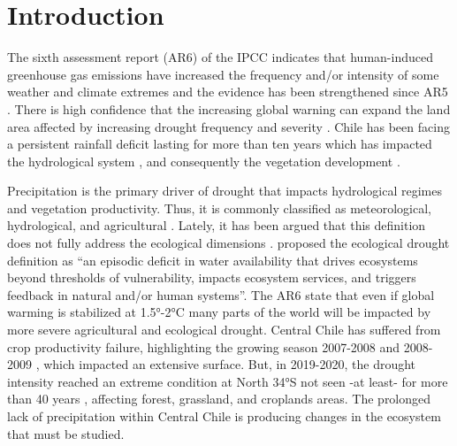 \documentclass[preprint,
3p]{elsarticle} %
\begin{document}
\hypertarget{introduction}{%
\section{Introduction}\label{introduction}}

The sixth assessment report (AR6) of the IPCC \citep{IPCC2021} indicates
that human-induced greenhouse gas emissions have increased the frequency
and/or intensity of some weather and climate extremes and the evidence
has been strengthened since AR5 \citep{IPCC2013}. There is high
confidence that the increasing global warning can expand the land area
affected by increasing drought frequency and severity
\citep{IPCCCH112021}. Chile has been facing a persistent rainfall
deficit lasting for more than ten years \citep{Garreaud2017} which has
impacted the hydrological system \citep{Boisier2018}, and consequently
the vegetation development \citep{Zambrano2020}.

Precipitation is the primary driver of drought that impacts hydrological
regimes and vegetation productivity. Thus, it is commonly classified as
meteorological, hydrological, and agricultural \citep{Wilhite1985}.
Lately, it has been argued that this definition does not fully address
the ecological dimensions \citep{Crausbay2017}. \citet{Crausbay2017}
proposed the ecological drought definition as ``an episodic deficit in
water availability that drives ecosystems beyond thresholds of
vulnerability, impacts ecosystem services, and triggers feedback in
natural and/or human systems''. The AR6 \citep{IPCC2021} state that even
if global warming is stabilized at 1.5°-2°C many parts of the world will
be impacted by more severe agricultural and ecological drought. Central
Chile has suffered from crop productivity failure, highlighting the
growing season 2007-2008 and 2008-2009
\citep{Zambrano2016, Zambrano2018}, which impacted an extensive surface.
But, in 2019-2020, the drought intensity reached an extreme condition at
North 34°S not seen -at least- for more than 40 years
\citep{Zambrano2020}, affecting forest, grassland, and croplands areas.
The prolonged lack of precipitation within Central Chile is producing
changes in the ecosystem that must be studied.
\end{document}
